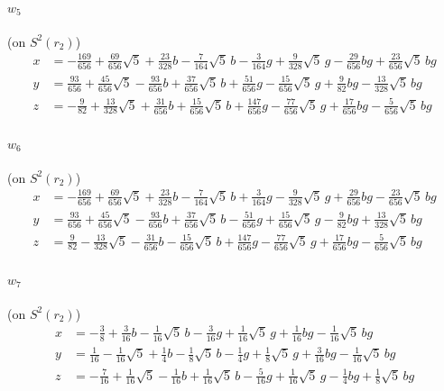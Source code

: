 \documentclass[11pt]{article}
\theoremstyle{remark}
\begin{document}
{\paragraph{$w_{5}$} (on $S^2(r_2)$)
\begin{align*}
x&=-\tfrac{169}{656}+\tfrac{69}{656}\sqrt5+\tfrac{23}{328}b-\tfrac{7}{164}\sqrt5\,b-\tfrac{3}{164}g+\tfrac{9}{328}\sqrt5\,g-\tfrac{29}{656}bg+\tfrac{23}{656}\sqrt5\,bg\\
y&=\tfrac{93}{656}+\tfrac{45}{656}\sqrt5-\tfrac{93}{656}b+\tfrac{37}{656}\sqrt5\,b+\tfrac{51}{656}g-\tfrac{15}{656}\sqrt5\,g+\tfrac{9}{82}bg-\tfrac{13}{328}\sqrt5\,bg\\
z&=-\tfrac{9}{82}+\tfrac{13}{328}\sqrt5+\tfrac{31}{656}b+\tfrac{15}{656}\sqrt5\,b+\tfrac{147}{656}g-\tfrac{77}{656}\sqrt5\,g+\tfrac{17}{656}bg-\tfrac{5}{656}\sqrt5\,bg
\end{align*}

\paragraph{$w_{6}$} (on $S^2(r_2)$)
\begin{align*}
x&=-\tfrac{169}{656}+\tfrac{69}{656}\sqrt5+\tfrac{23}{328}b-\tfrac{7}{164}\sqrt5\,b+\tfrac{3}{164}g-\tfrac{9}{328}\sqrt5\,g+\tfrac{29}{656}bg-\tfrac{23}{656}\sqrt5\,bg\\
y&=\tfrac{93}{656}+\tfrac{45}{656}\sqrt5-\tfrac{93}{656}b+\tfrac{37}{656}\sqrt5\,b-\tfrac{51}{656}g+\tfrac{15}{656}\sqrt5\,g-\tfrac{9}{82}bg+\tfrac{13}{328}\sqrt5\,bg\\
z&=\tfrac{9}{82}-\tfrac{13}{328}\sqrt5-\tfrac{31}{656}b-\tfrac{15}{656}\sqrt5\,b+\tfrac{147}{656}g-\tfrac{77}{656}\sqrt5\,g+\tfrac{17}{656}bg-\tfrac{5}{656}\sqrt5\,bg
\end{align*}

\paragraph{$w_{7}$} (on $S^2(r_2)$)
\begin{align*}
x&=-\tfrac{3}{8}+\tfrac{3}{16}b-\tfrac{1}{16}\sqrt5\,b-\tfrac{3}{16}g+\tfrac{1}{16}\sqrt5\,g+\tfrac{1}{16}bg-\tfrac{1}{16}\sqrt5\,bg\\
y&=\tfrac{1}{16}-\tfrac{1}{16}\sqrt5+\tfrac{1}{4}b-\tfrac{1}{8}\sqrt5\,b-\tfrac{1}{4}g+\tfrac{1}{8}\sqrt5\,g+\tfrac{3}{16}bg-\tfrac{1}{16}\sqrt5\,bg\\
z&=-\tfrac{7}{16}+\tfrac{1}{16}\sqrt5-\tfrac{1}{16}b+\tfrac{1}{16}\sqrt5\,b-\tfrac{5}{16}g+\tfrac{1}{16}\sqrt5\,g-\tfrac{1}{4}bg+\tfrac{1}{8}\sqrt5\,bg
\end{align*}

}
\end{document}
